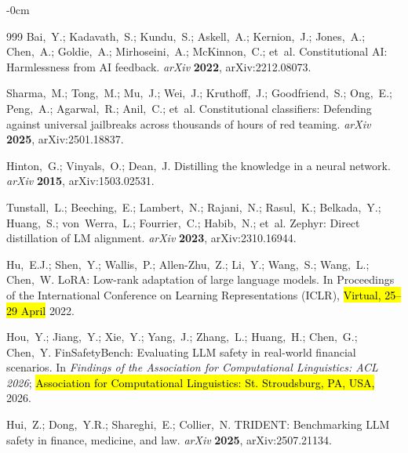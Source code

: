 \documentclass[superintelligence,article,accept,moreauthors]{Definitions/mdpi}
\begin{document}
\begin{adjustwidth}{-\extralength}{0cm}
{\begin{thebibliography}{999}
Bai,~Y.; Kadavath,~S.; Kundu,~S.; Askell,~A.; Kernion,~J.; Jones,~A.; Chen,~A.; Goldie,~A.; Mirhoseini,~A.; McKinnon,~C.; et~al.
Constitutional {AI}: Harmlessness from {AI} feedback.
{\em arXiv} {\bf 2022}, arXiv:2212.08073.


Sharma,~M.; Tong,~M.; Mu,~J.; Wei,~J.; Kruthoff,~J.; Goodfriend,~S.; Ong,~E.; Peng,~A.; Agarwal,~R.; Anil,~C.; et~al.
Constitutional classifiers: Defending against universal jailbreaks across thousands of hours of red teaming.
{\em arXiv} {\bf 2025}, arXiv:2501.18837.


Hinton,~G.; Vinyals,~O.; Dean,~J.
Distilling the knowledge in a neural network.
{\em arXiv} {\bf 2015}, arXiv:1503.02531.

Tunstall,~L.; Beeching,~E.; Lambert,~N.; Rajani,~N.; Rasul,~K.; Belkada,~Y.; Huang,~S.; von~Werra,~L.; Fourrier,~C.; Habib,~N.; et~al.
Zephyr: Direct distillation of {LM} alignment.
{\em arXiv} {\bf 2023}, arXiv:2310.16944.



Hu,~E.J.; Shen,~Y.; Wallis,~P.; Allen-Zhu,~Z.; Li,~Y.; Wang,~S.; Wang,~L.; Chen,~W.
{LoRA}: Low-rank adaptation of large language models.
In {Proceedings of the International Conference on Learning Representations (ICLR)}, \hl{Virtual, 25--29 April} 2022.




Hou,~Y.; Jiang,~Y.; Xie,~Y.; Yang,~J.; Zhang,~L.; Huang,~H.; Chen,~G.; Chen,~Y.
{FinSafetyBench}: Evaluating {LLM} safety in real-world financial scenarios.
In {\em Findings of the Association for Computational Linguistics: ACL 2026}; \hl{Association for Computational Linguistics: St. Stroudsburg, PA, USA,} 2026.

Hui,~Z.; Dong,~Y.R.; Shareghi,~E.; Collier,~N.
{TRIDENT}: Benchmarking {LLM} safety in finance, medicine, and law.
{\em arXiv} {\bf 2025}, arXiv:2507.21134.
\end{thebibliography}
}

\PublishersNote{}
\end{adjustwidth}
\end{document}
